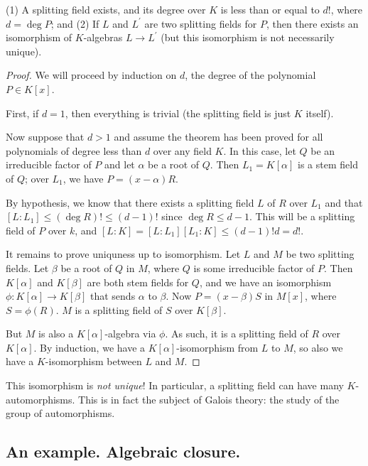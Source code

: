 \begin{thm}
(1) A splitting field exists, and its degree over $K$ is less than or equal to $d!$, where $d = \deg P$; and (2) If $L$ and $L^\prime$ are two splitting fields for $P$, then there exists an isomorphism of $K$-algebras $L \to L^\prime$ (but this isomorphism is not necessarily unique).
\end{thm}
\begin{proof}
We will proceed by induction on $d$, the degree of the polynomial $P \in K[x]$.

First, if $d = 1$, then everything is trivial (the splitting field is just $K$ itself).

Now suppose that $d > 1$ and assume the theorem has been proved for all polynomials of degree less than $d$ over any field $K$. In this case, let $Q$ be an irreducible factor of $P$ and let $\alpha$ be a root of $Q$. Then $L_1 = K[\alpha]$ is a stem field of $Q$; over $L_1$, we have $P = (x - \alpha) R$.

By hypothesis, we know that there exists a splitting field $L$ of $R$ over $L_1$ and that $[L:L_1] \leq (\deg R)! \leq (d - 1)!$ since $\deg R \leq d - 1$. This will be a splitting field of $P$ over $k$, and $[L:K] = [L:L_1] [L_1:K] \leq (d-1)! d = d!$.

It remains to prove uniquness up to isomorphism. Let $L$ and $M$ be two splitting fields. Let $\beta$ be a root of $Q$ in $M$, where $Q$ is some irreducible factor of $P$. Then $K[\alpha]$ and $K[\beta]$ are both stem fields for $Q$, and we have an isomorphism $\phi: K[\alpha] \to K[\beta]$ that sends $\alpha$ to $\beta$. Now $P = (x - \beta) S$ in $M[x]$, where $S = \phi(R)$. $M$ is a splitting field of $S$ over $K[\beta]$.

But $M$ is also a $K[\alpha]$-algebra via $\phi$. As such, it is a splitting field of $R$ over $K[\alpha]$. By induction, we have a $K[\alpha]$-isomorphism from $L$ to $M$, so also we have a $K$-isomorphism between $L$ and $M$.
\end{proof}

\begin{rmk}
This isomorphism is \emph{not unique}! In particular, a splitting field can have many $K$-automorphisms. This is in fact the subject of Galois theory: the study of the group of automorphisms.
\end{rmk}

\subsection{An example. Algebraic closure.}

